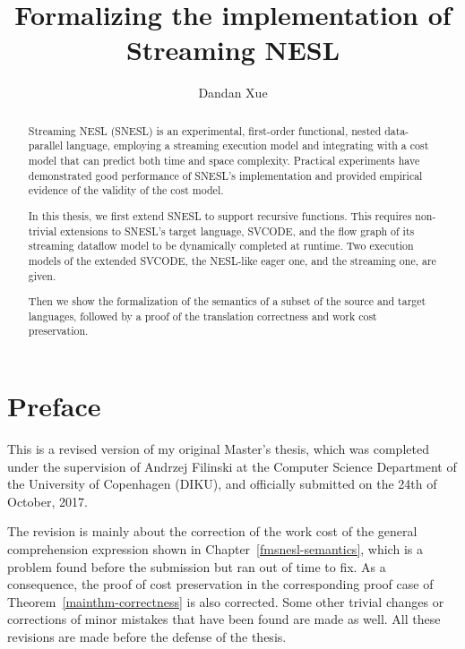 \documentclass[a4paper]{report}
\title{Formalizing the implementation of Streaming NESL}
\author{Dandan Xue}
\numberwithin{equation}{chapter}
\numberwithin{figure}{chapter}
\begin{document}
\large



\begin{abstract}
 Streaming NESL (SNESL) is an experimental, first-order functional, nested data-parallel language, employing a streaming execution model and integrating with a cost model that can predict both time and space complexity.
 Practical experiments have demonstrated good performance of SNESL's implementation and provided empirical evidence of the validity of the cost model.
 
 In this thesis, we first extend SNESL to support recursive functions.
 This requires non-trivial extensions to SNESL's target language, SVCODE, and the flow graph of its streaming dataflow model to be dynamically completed at runtime.
 Two execution models of the extended SVCODE, the NESL-like eager one, and the streaming one, are given.
 
 Then we show the formalization of the semantics of a subset of the source and target languages, followed by a proof of the translation correctness and work cost preservation.
 
\end{abstract}



\tableofcontents



\chapter*{Preface}

This is a revised version of my original Master's thesis, which was completed under the supervision of Andrzej Filinski at the Computer Science Department of the University of Copenhagen (DIKU), and officially submitted on the 24th of October, 2017. 

The revision is mainly about the correction of the work cost of the general comprehension expression shown in Chapter~\ref{fmsnesl-semantics}, which is a problem found before the submission but ran out of time to fix. 
As a consequence, the proof of cost preservation in the corresponding proof case of Theorem~\ref{mainthm-correctness} is also corrected.
Some other trivial changes or corrections of minor mistakes that have been found are made as well. 
All these revisions are made before the defense of the thesis.









\end{document}
